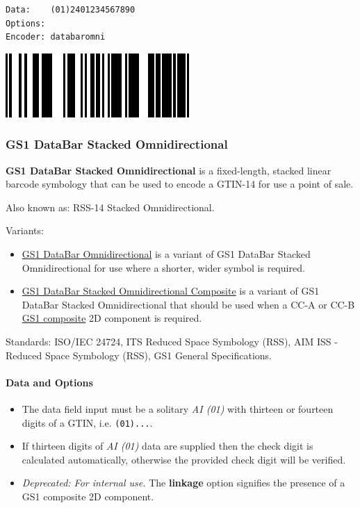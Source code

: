 \begin{verbatim}
Data:    (01)2401234567890
Options: 
Encoder: databaromni
\end{verbatim}

\includegraphics{images/databaromni-1.eps}

\hypertarget{gs1-databar-stacked-omnidirectional}{%
\subsubsection{GS1 DataBar Stacked
Omnidirectional}\label{gs1-databar-stacked-omnidirectional}}

\textbf{GS1 DataBar Stacked Omnidirectional} is a fixed-length, stacked
linear barcode symbology that can be used to encode a GTIN-14 for use a
point of sale.

Also known as: RSS-14 Stacked Omnidirectional.

Variants:

\begin{itemize}
\tightlist
\item
  \protect\hyperlink{gs1-databar-omnidirectional}{GS1 DataBar
  Omnidirectional} is a variant of GS1 DataBar Stacked Omnidirectional
  for use where a shorter, wider symbol is required.
\item
  \protect\hyperlink{gs1-composite-symbols}{GS1 DataBar Stacked
  Omnidirectional Composite} is a variant of GS1 DataBar Stacked
  Omnidirectional that should be used when a CC-A or CC-B
  \protect\hyperlink{gs1-composite-symbols}{GS1 composite} 2D component
  is required.
\end{itemize}

Standards: ISO/IEC 24724, ITS Reduced Space Symbology (RSS), AIM ISS -
Reduced Space Symbology (RSS), GS1 General Specifications.

\hypertarget{data-and-options-35}{%
\paragraph{Data and Options}\label{data-and-options-35}}

\begin{itemize}
\tightlist
\item
  The data field input must be a solitary \emph{AI (01)} with thirteen
  or fourteen digits of a GTIN, i.e. \texttt{(01)...}.
\item
  If thirteen digits of \emph{AI (01)} data are supplied then the check
  digit is calculated automatically, otherwise the provided check digit
  will be verified.
\item
  \emph{Deprecated: For internal use.} The \textbf{linkage} option
  signifies the presence of a GS1 composite 2D component.
\end{itemize}

